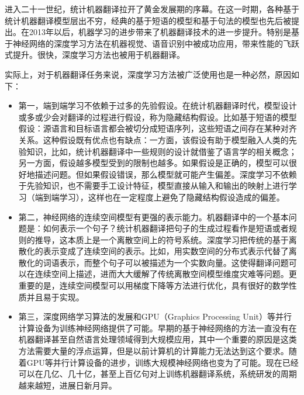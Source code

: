 \parinterval 进入二十一世纪，统计机器翻译拉开了黄金发展期的序幕。在这一时期，各种基于统计机器翻译模型层出不穷，经典的基于短语的模型和基于句法的模型也先后被提出。在2013年以后，机器学习的进步带来了机器翻译技术的进一步提升。特别是基于神经网络的深度学习方法在机器视觉、语音识别中被成功应用，带来性能的飞跃式提升。很快，深度学习方法也被用于机器翻译。

\parinterval 实际上，对于机器翻译任务来说，深度学习方法被广泛使用也是一种必然，原因如下：

\begin{itemize}
\vspace{0.5em}
\item 第一，端到端学习不依赖于过多的先验假设。在统计机器翻译时代，模型设计或多或少会对翻译的过程进行假设，称为隐藏结构假设。比如基于短语的模型假设：源语言和目标语言都会被切分成短语序列，这些短语之间存在某种对齐关系。这种假设既有优点也有缺点：一方面，该假设有助于模型融入人类的先验知识，比如，统计机器翻译中一些规则的设计就借鉴了语言学的相关概念；另一方面，假设越多模型受到的限制也越多。如果假设是正确的，模型可以很好地描述问题。但如果假设错误，那么模型就可能产生偏差。深度学习不依赖于先验知识，也不需要手工设计特征，模型直接从输入和输出的映射上进行学习（端到端学习），这样也在一定程度上避免了隐藏结构假设造成的偏差。
\vspace{0.5em}
\item 第二，神经网络的连续空间模型有更强的表示能力。机器翻译中的一个基本问题是：如何表示一个句子？统计机器翻译把句子的生成过程看作是短语或者规则的推导，这本质上是一个离散空间上的符号系统。深度学习把传统的基于离散化的表示变成了连续空间的表示。比如，用实数空间的分布式表示代替了离散化的词语表示，而整个句子可以被描述为一个实数向量。这使得翻译问题可以在连续空间上描述，进而大大缓解了传统离散空间模型维度灾难等问题。更重要的是，连续空间模型可以用梯度下降等方法进行优化，具有很好的数学性质并且易于实现。
\vspace{0.5em}
\item 第三，深度网络学习算法的发展和GPU（Graphics Processing Unit）等并行计算设备为训练神经网络提供了可能。早期的基于神经网络的方法一直没有在机器翻译甚至自然语言处理领域得到大规模应用，其中一个重要的原因是这类方法需要大量的浮点运算，但是以前计算机的计算能力无法达到这个要求。随着GPU等并行计算设备的进步，训练大规模神经网络也变为了可能。现在已经可以在几亿、几十亿，甚至上百亿句对上训练机器翻译系统，系统研发的周期越来越短，进展日新月异。
\vspace{0.5em}
\end{itemize}

